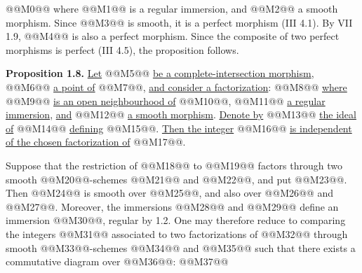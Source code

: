 @@M0@@
where @@M1@@ is a
regular immersion, and @@M2@@ a smooth morphism. Since @@M3@@ is smooth, it is a perfect morphism (III 4.1). By VII 1.9, @@M4@@ is also a perfect morphism. Since the composite of two perfect morphisms is perfect (III 4.5), the proposition follows.

\textbf{Proposition 1.8.} \uline{Let} @@M5@@ \uline{be a complete-intersection morphism}, @@M6@@ \uline{a point of} @@M7@@, \uline{and consider a factorization}:
@@M8@@
\uline{where} @@M9@@ \uline{is an open neighbourhood of} @@M10@@, @@M11@@ \uline{a regular immersion}, \uline{and} @@M12@@ \uline{a smooth morphism}. \uline{Denote by} @@M13@@ \uline{the ideal of} @@M14@@ \uline{defining} @@M15@@. \uline{Then the integer}
@@M16@@
\uline{is independent of the chosen factorization of} @@M17@@.

Suppose that the restriction of @@M18@@ to @@M19@@ factors through two smooth @@M20@@-schemes @@M21@@ and @@M22@@, and put @@M23@@. Then @@M24@@ is smooth over @@M25@@, and also over @@M26@@ and @@M27@@. Moreover, the immersions @@M28@@ and @@M29@@ define an immersion @@M30@@, regular by 1.2. One may therefore reduce to comparing the integers @@M31@@ associated to two factorizations of @@M32@@ through smooth @@M33@@-schemes @@M34@@ and @@M35@@ such that there exists a commutative diagram over @@M36@@:
@@M37@@
